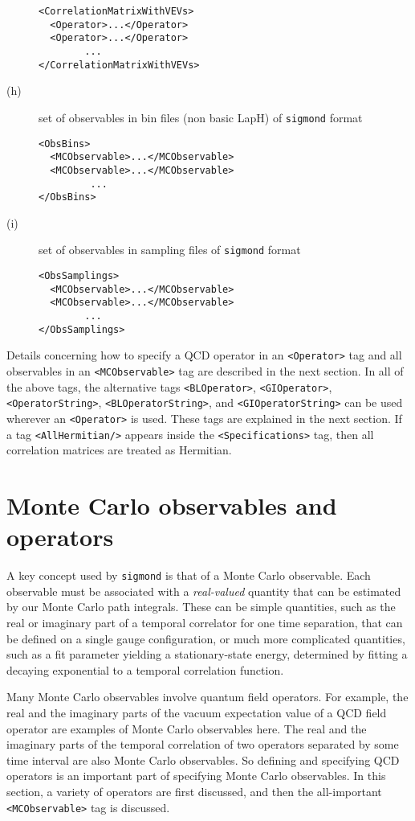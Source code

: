 \documentclass[12pt]{article}
\newcommand{\vb}{\texttt}
\begin{document}
\begin{description}
\begin{verbatim}
<CorrelationMatrixWithVEVs>
  <Operator>...</Operator>
  <Operator>...</Operator>
        ... 
</CorrelationMatrixWithVEVs>
\end{verbatim}
\item[(h)]
 set of observables in bin files (non basic LapH) of \vb{sigmond} format
\begin{verbatim}
<ObsBins>
  <MCObservable>...</MCObservable>
  <MCObservable>...</MCObservable>
         ...
</ObsBins>
\end{verbatim}
\item[(i)]
 set of observables in sampling files of \vb{sigmond} format
\begin{verbatim}
<ObsSamplings>
  <MCObservable>...</MCObservable>
  <MCObservable>...</MCObservable>
        ... 
</ObsSamplings>
\end{verbatim}
\end{description}

Details concerning how to specify a QCD operator in an \vb{<Operator>}
tag and all observables in an \vb{<MCObservable>} tag are described in the
next section.  In all of the above tags, the alternative tags \vb{<BLOperator>}, 
\vb{<GIOperator>}, \vb{<OperatorString>}, \vb{<BLOperatorString>}, and
\vb{<GIOperatorString>} can be used wherever an \vb{<Operator>} is used.
These tags are explained in the next section.
If a tag \vb{<AllHermitian/>} appears inside the \vb{<Specifications>}
tag, then all correlation matrices are treated as Hermitian.

\section{Monte Carlo observables and operators}

A key concept used by \vb{sigmond} is that of a Monte Carlo observable.
Each observable must be associated with a \textit{real-valued} quantity that 
can be estimated by our Monte Carlo path integrals.  These can be simple 
quantities, such as the real or imaginary part of a temporal correlator for
one time separation, that can be defined on a single gauge configuration, 
or much more complicated quantities, such as a fit parameter yielding a
stationary-state energy, determined by fitting a decaying exponential to a 
temporal correlation function. 

Many Monte Carlo observables involve quantum field operators.  For example,
the real and the imaginary parts of the vacuum expectation value of a QCD
field operator are examples of Monte Carlo observables here.  The real
and the imaginary parts of the temporal correlation of two operators 
separated by some time interval are also Monte Carlo observables.  So
defining and specifying QCD operators is an important part of specifying
Monte Carlo observables.  In this section, a variety of operators are
first discussed, and then the all-important \vb{<MCObservable>} tag is
discussed.
\end{document}
